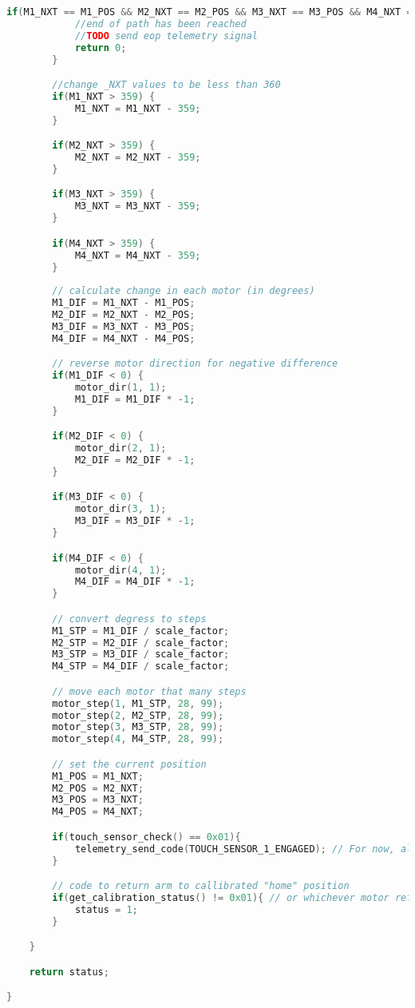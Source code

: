 \begin{lstlisting}[language=C]
		if(M1_NXT == M1_POS && M2_NXT == M2_POS && M3_NXT == M3_POS && M4_NXT == M4_POS) {
			//end of path has been reached
			//TODO send eop telemetry signal
			return 0;
		}

		//change _NXT values to be less than 360
		if(M1_NXT > 359) {
			M1_NXT = M1_NXT - 359;
		}

		if(M2_NXT > 359) {
			M2_NXT = M2_NXT - 359;
		}

		if(M3_NXT > 359) {
			M3_NXT = M3_NXT - 359;
		}

		if(M4_NXT > 359) {
			M4_NXT = M4_NXT - 359;
		}
		
		// calculate change in each motor (in degrees)
		M1_DIF = M1_NXT - M1_POS;
		M2_DIF = M2_NXT - M2_POS;
		M3_DIF = M3_NXT - M3_POS;
		M4_DIF = M4_NXT - M4_POS;

		// reverse motor direction for negative difference
		if(M1_DIF < 0) {
			motor_dir(1, 1);
			M1_DIF = M1_DIF * -1;
		}

		if(M2_DIF < 0) {
			motor_dir(2, 1);
			M2_DIF = M2_DIF * -1;
		}

		if(M3_DIF < 0) {
			motor_dir(3, 1);
			M3_DIF = M3_DIF * -1;
		}

		if(M4_DIF < 0) {
			motor_dir(4, 1);
			M4_DIF = M4_DIF * -1;
		}

		// convert degress to steps
		M1_STP = M1_DIF / scale_factor;
		M2_STP = M2_DIF / scale_factor;
		M3_STP = M3_DIF / scale_factor;
		M4_STP = M4_DIF / scale_factor;

		// move each motor that many steps
		motor_step(1, M1_STP, 28, 99);
		motor_step(2, M2_STP, 28, 99);
		motor_step(3, M3_STP, 28, 99);
		motor_step(4, M4_STP, 28, 99);

		// set the current position
		M1_POS = M1_NXT;
		M2_POS = M2_NXT;
		M3_POS = M3_NXT;
		M4_POS = M4_NXT;

		if(touch_sensor_check() == 0x01){
			telemetry_send_code(TOUCH_SENSOR_1_ENGAGED); // For now, always send TOUCH_SENSOR_1_ENGAGED.
		}

		// code to return arm to callibrated "home" position
		if(get_calibration_status() != 0x01){ // or whichever motor refers to the home position
			status = 1;
		}

	}

	return status;

}
\end{lstlisting}
